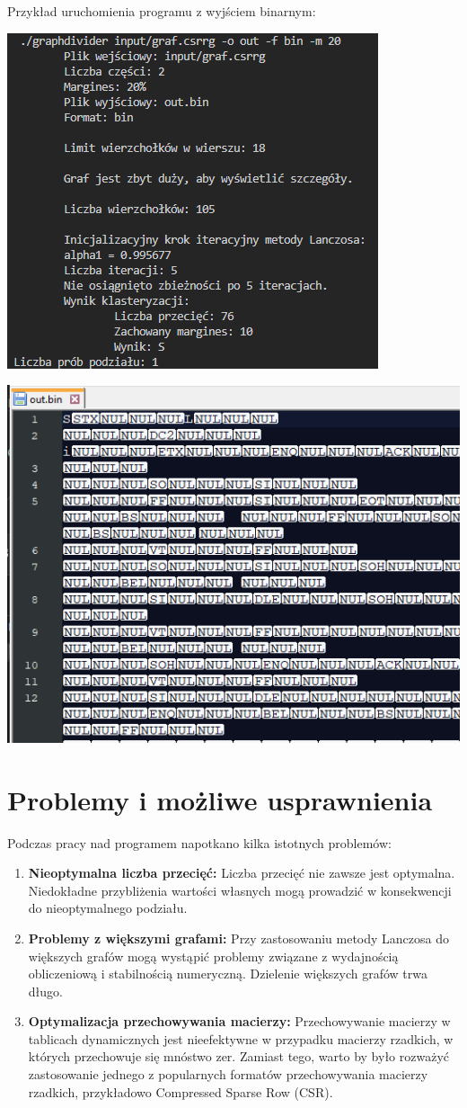 \documentclass{article}
\begin{document}
    Przykład uruchomienia programu z wyjściem binarnym:
    \begin{center}
        \includegraphics[width=0.5\linewidth]{img/uruchomienie3.png}
    \end{center}
    \begin{center}
        \includegraphics[width=0.75\linewidth]{img/uruchomienie4.png}
    \end{center}



    \section{Problemy i możliwe usprawnienia}
    Podczas pracy nad programem napotkano kilka istotnych problemów:
    \begin{enumerate}
        \item \textbf{Nieoptymalna liczba przecięć:} Liczba przecięć nie zawsze jest optymalna. Niedokładne przybliżenia wartości własnych mogą prowadzić w konsekwencji do nieoptymalnego podziału.
        \item \textbf{Problemy z większymi grafami:} Przy zastosowaniu metody Lanczosa do większych grafów mogą wystąpić problemy związane z wydajnością obliczeniową i stabilnością numeryczną. Dzielenie większych grafów trwa długo.
        \item \textbf{Optymalizacja przechowywania macierzy:} Przechowywanie macierzy w tablicach dynamicznych jest nieefektywne w przypadku macierzy rzadkich, w których przechowuje się mnóstwo zer. Zamiast tego, warto by było rozważyć zastosowanie jednego z popularnych formatów przechowywania macierzy rzadkich, przykładowo Compressed Sparse Row (CSR).
    \end{enumerate}
    
\end{document}
